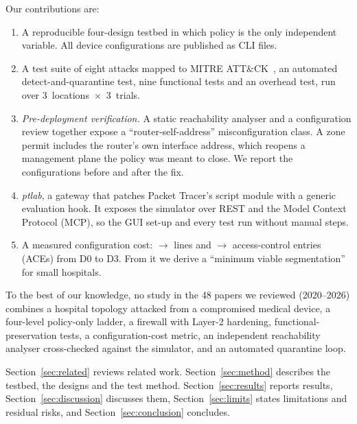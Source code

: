 \noindent Our contributions are:
\begin{enumerate}
\item A reproducible four-design testbed in which policy is the only independent variable. All \devsDthree{} device configurations are published as CLI files.
\item A test suite of eight attacks mapped to MITRE ATT\&CK~\cite{mitreattack}, an automated detect-and-quarantine test, nine functional tests and an overhead test, run over 3~locations~$\times$~3~trials.
\item \emph{Pre-deployment verification.} A static reachability analyser and a configuration review together expose a ``router-self-address'' misconfiguration class. A zone permit includes the router's own interface address, which reopens a management plane the policy was meant to close. We report the configurations before and after the fix.
\item \emph{ptlab}, a gateway that patches Packet Tracer's script module with a generic evaluation hook. It exposes the simulator over REST and the Model Context Protocol (MCP), so the GUI set-up and every test run without manual steps.
\item A measured configuration cost: \cfgLinesDzero{}$\rightarrow$\cfgLinesDthree{} lines and \acesDzero{}$\rightarrow$\acesDthree{} access-control entries (ACEs) from D0 to D3. From it we derive a ``minimum viable segmentation'' for small hospitals.
\end{enumerate}
To the best of our knowledge, no study in the 48 papers we reviewed (2020--2026) combines a hospital topology attacked from a compromised medical device, a four-level policy-only ladder, a firewall with Layer-2 hardening, functional-preservation tests, a configuration-cost metric, an independent reachability analyser cross-checked against the simulator, and an automated quarantine loop.

Section~\ref{sec:related} reviews related work. Section~\ref{sec:method} describes the testbed, the designs and the test method. Section~\ref{sec:results} reports results, Section~\ref{sec:discussion} discusses them, Section~\ref{sec:limits} states limitations and residual risks, and Section~\ref{sec:conclusion} concludes.
